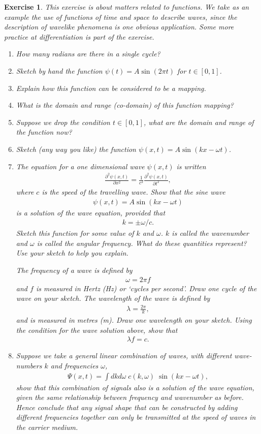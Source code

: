\documentclass{book}
\newtheorem{exercise}{Exercise}
\def\beq{\begin{eqnarray}}
\def\eeq{\end{eqnarray}}
\begin{document}
\begin{exercise} 
This exercise is about matters related to {\em functions}. We take as
an example the use of functions of time and space to describe waves,
since the description of wavelike phenomena is one obvious
application. Some more practice at differentiation is part of the
exercise.
\begin{enumerate}
\item How many radians are there in a single cycle?
\item Sketch by hand the function $\psi(t) = A \sin(2\pi t)$ for $t \in [0,1]$.
\item Explain how this function can be considered to be a mapping.
\item What is the domain and range (co-domain) of this function mapping?
\item Suppose we drop the condition $t \in [0,1]$, what are the domain and range
of the function now?
\item Sketch (any way you like) the function $\psi(x,t) = A\sin(kx-\omega t)$.

\item The equation for a  one dimensional wave $\psi(x,t)$ is written
\beq
\frac{\partial^2\psi(x,t)}{\partial x^2} = \frac{1}{c^2} \frac{\partial^2\psi(x,t)}{\partial t^2},
\eeq
where $c$ is the speed of the travelling wave.  Show that the sine
wave
\beq
\psi(x,t) = A\sin(kx - \omega t)
\eeq
is a solution of the wave equation, provided that
\beq
k = \pm \omega/c.
\eeq
Sketch this function for some value of $k$ and $\omega$.  $k$ is
called the {\em wavenumber} and $\omega$ is called the {\em angular
frequency}.  What do these quantities represent? Use your sketch to
help you explain.

The {\em frequency} of a wave is defined by
\beq
\omega = 2\pi f
\eeq
and $f$ is measured in Hertz (Hz) or `cycles per second'. Draw one
cycle of the wave on your sketch. The wavelength of the wave is
defined by
\beq
\lambda = \frac{2\pi}{k},
\eeq
and is measured in metres (m). Draw one wavelength on your
sketch. Using the condition for the wave solution above, show that
\beq
\lambda f = c.
\eeq
 
\item Suppose we take a general linear combination of waves, with
different wave-numbers $k$ and frequencies $\omega$,
\beq
\Psi(x,t) = \int dkd\omega \; c(k,\omega)\; \sin(kx-\omega t),
\eeq
show that this combination of signals also is a solution of the wave
equation, given the same relationship between frequency and wavenumber
as before.  Hence conclude that any signal shape that can be constructed
by adding different frequencies together can only be transmitted at the speed of
waves in the carrier medium.
\end{enumerate}
\end{exercise}
\begin{solution}
\end{solution}
\end{document}
